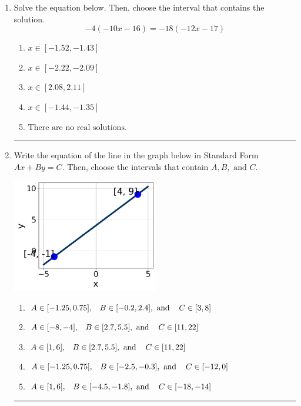 \documentclass[14pt]{extbook}
\newcommand{\litem}[1]{\item#1\hspace*{-1cm}\rule{\textwidth}{0.4pt}}
\begin{document}
\begin{enumerate}
{\begin{enumerate}[label=\Alph*.]
\end{enumerate} }
\litem{
Solve the equation below. Then, choose the interval that contains the solution.\[ -4(-10x -16) = -18(-12x -17) \]\begin{enumerate}[label=\Alph*.]
\item \( x \in [-1.52, -1.43] \)
\item \( x \in [-2.22, -2.09] \)
\item \( x \in [2.08, 2.11] \)
\item \( x \in [-1.44, -1.35] \)
\item \( \text{There are no real solutions.} \)

\end{enumerate} }
\litem{
Write the equation of the line in the graph below in Standard Form $Ax+By=C$. Then, choose the intervals that contain $A, B, \text{ and } C$.
\begin{center}
    \includegraphics[width=0.5\textwidth]{../Figures/linearGraphToStandardCopyB.png}
\end{center}
\begin{enumerate}[label=\Alph*.]
\item \( A \in [-1.25, 0.75], \hspace{3mm} B \in [-0.2, 2.4], \text{ and } \hspace{3mm} C \in [3, 8] \)
\item \( A \in [-8, -4], \hspace{3mm} B \in [2.7, 5.5], \text{ and } \hspace{3mm} C \in [11, 22] \)
\item \( A \in [1, 6], \hspace{3mm} B \in [2.7, 5.5], \text{ and } \hspace{3mm} C \in [11, 22] \)
\item \( A \in [-1.25, 0.75], \hspace{3mm} B \in [-2.5, -0.3], \text{ and } \hspace{3mm} C \in [-12, 0] \)
\item \( A \in [1, 6], \hspace{3mm} B \in [-4.5, -1.8], \text{ and } \hspace{3mm} C \in [-18, -14] \)


\end{enumerate}}
\end{enumerate}
\end{document}
